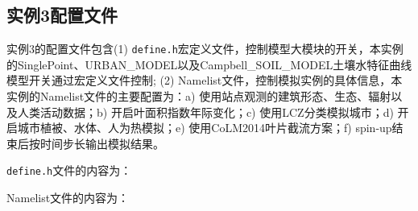 \subsection{实例3配置文件}\label{ex3config}
实例3的配置文件包含(1) \texttt{define.h}宏定义文件，控制模型大模块的开关，本实例的SinglePoint、URBAN\_MODEL以及Campbell\_SOIL\_MODEL土壤水特征曲线模型开关通过宏定义文件控制; (2) Namelist文件，控制模拟实例的具体信息，本实例的Namelist文件的主要配置为：a) 使用站点观测的建筑形态、生态、辐射以及人类活动数据；b) 开启叶面积指数年际变化；c) 使用LCZ分类模拟城市；d) 开启城市植被、水体、人为热模拟；e) 使用CoLM2014叶片截流方案；f) spin-up结束后按时间步长输出模拟结果。

\texttt{define.h}文件的内容为：


Namelist文件的内容为：


